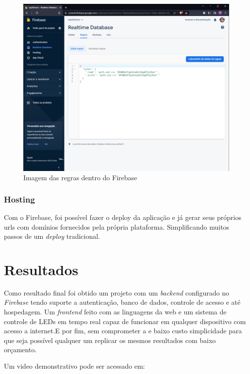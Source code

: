 \documentclass[12pt]{article}
\begin{document}
\begin{figure}[ht]
  \centering
  \includegraphics[width=.5\textwidth]{Images/rules.png}
  \caption{Imagem das regras dentro do Firebase}
  \label{fig:FirebaseRules}
\end{figure}

\subsubsection{Hosting}
Com o Firebase, foi possível fazer o deploy da aplicação e já gerar seus próprios urls com domínios fornecidos pela própria plataforma. Simplificando muitos passos de um \emph{deploy} tradicional.

\section{Resultados}
Como resultado final foi obtido um projeto com um \emph{backend} configurado no \emph{Firebase} tendo suporte a autenticação, banco de dados, controle de acesso e até hospedagem. Um  \emph{frontend} feito
com as linguagens da web e um sistema de controle de LEDs em tempo real capaz de funcionar em qualquer dispositivo com acesso a internet.E por fim, sem comprometer a e baixo custo simplicidade
para que seja possível qualquer um replicar os mesmos resultados com baixo orçamento.

Um video demonstrativo pode ser acessado em: \href{https://drive.google.com/file/d/1KFUTW1jYnxYv23ianrwgQhIxSgZv7Ih3/view?usp=sharing}{}
\end{document}
